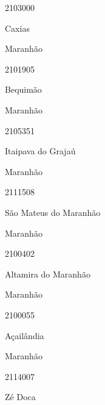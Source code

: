 \documentclass[
  letterpaper,
]{report}
\begin{document}
\n      

2103000

\n      

Caxias

\n    

\n    

\n      

Maranhão

\n      

2101905

\n      

Bequimão

\n    

\n    

\n      

Maranhão

\n      

2105351

\n      

Itaipava do Grajaú

\n    

\n    

\n      

Maranhão

\n      

2111508

\n      

São Mateus do Maranhão

\n    

\n    

\n      

Maranhão

\n      

2100402

\n      

Altamira do Maranhão

\n    

\n    

\n      

Maranhão

\n      

2100055

\n      

Açailândia

\n    

\n    

\n      

Maranhão

\n      

2114007

\n      

Zé Doca
\end{document}
